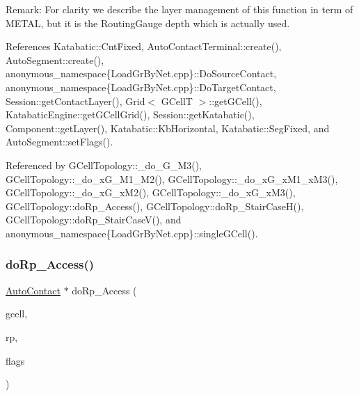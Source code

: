 \begin{DoxyParagraph}{Remark\+: For clarity we describe the layer management of this function in term}
of {\ttfamily M\+E\+T\+AL}, but it is the Routing\+Gauge depth which is actually used.
\end{DoxyParagraph}
 

References Katabatic\+::\+Cnt\+Fixed, Auto\+Contact\+Terminal\+::create(), Auto\+Segment\+::create(), anonymous\+\_\+namespace\{\+Load\+Gr\+By\+Net.\+cpp\}\+::\+Do\+Source\+Contact, anonymous\+\_\+namespace\{\+Load\+Gr\+By\+Net.\+cpp\}\+::\+Do\+Target\+Contact, Session\+::get\+Contact\+Layer(), Grid$<$ G\+Cell\+T $>$\+::get\+G\+Cell(), Katabatic\+Engine\+::get\+G\+Cell\+Grid(), Session\+::get\+Katabatic(), Component\+::get\+Layer(), Katabatic\+::\+Kb\+Horizontal, Katabatic\+::\+Seg\+Fixed, and Auto\+Segment\+::set\+Flags().



Referenced by G\+Cell\+Topology\+::\+\_\+do\+\_\+G\+\_\+M3(), G\+Cell\+Topology\+::\+\_\+do\+\_\+x\+G\+\_\+M1\+\_\+M2(), G\+Cell\+Topology\+::\+\_\+do\+\_\+x\+G\+\_\+x\+M1\+\_\+x\+M3(), G\+Cell\+Topology\+::\+\_\+do\+\_\+x\+G\+\_\+x\+M2(), G\+Cell\+Topology\+::\+\_\+do\+\_\+x\+G\+\_\+x\+M3(), G\+Cell\+Topology\+::do\+Rp\+\_\+\+Access(), G\+Cell\+Topology\+::do\+Rp\+\_\+\+Stair\+Case\+H(), G\+Cell\+Topology\+::do\+Rp\+\_\+\+Stair\+Case\+V(), and anonymous\+\_\+namespace\{\+Load\+Gr\+By\+Net.\+cpp\}\+::single\+G\+Cell().

\mbox{\label{group__LoadGlobalRouting_gada6d3c694b8d741b6504b7c3da166357}} 
\subsubsection{\texorpdfstring{do\+Rp\+\_\+\+Access()}{doRp\_Access()}}
{\footnotesize\ttfamily \mbox{\hyperlink{classKatabatic_1_1AutoContact}{Auto\+Contact}} $\ast$ do\+Rp\+\_\+\+Access (\begin{DoxyParamCaption}\item[{\mbox{\hyperlink{classKatabatic_1_1GCell}{G\+Cell}} $\ast$}]{gcell,  }\item[{\textbf{ Component} $\ast$}]{rp,  }\item[{unsigned int}]{flags }\end{DoxyParamCaption})\hspace{0.3cm}{\ttfamily [static]}}


